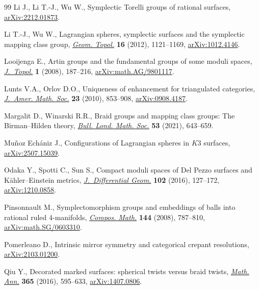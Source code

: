 \documentclass[pdftex]{sigma}
\theoremstyle{definition}
\numberwithin{equation}{section}
\begin{document}
\begin{thebibliography}{99}
Li J., Li T.-J., Wu W., Symplectic {T}orelli groups of rational surfaces,
 \href{http://arxiv.org/abs/2212.01873}{arXiv:2212.01873}.

Li T.-J., Wu W., Lagrangian spheres, symplectic surfaces and the symplectic
 mapping class group,
 \href{https://doi.org/10.2140/gt.2012.16.1121}{\textit{Geom. Topol.}}
 \textbf{16} (2012), 1121--1169,
 \href{http://arxiv.org/abs/1012.4146}{arXiv:1012.4146}.

Looijenga E., Artin groups and the fundamental groups of some moduli spaces,
 \href{https://doi.org/10.1112/jtopol/jtm009}{\textit{J.~Topol.}} \textbf{1}
 (2008), 187--216,
 \href{http://arxiv.org/abs/math.AG/9801117}{arXiv:math.AG/9801117}.

Lunts V.A., Orlov D.O., Uniqueness of enhancement for triangulated categories,
 \href{https://doi.org/10.1090/S0894-0347-10-00664-8}{\textit{J.~Amer. Math.
 Soc.}} \textbf{23} (2010), 853--908,
 \href{http://arxiv.org/abs/0908.4187}{arXiv:0908.4187}.

Margalit D., Winarski R.R., Braid groups and mapping class groups: {T}he
 {B}irman--{H}ilden theory,
 \href{https://doi.org/10.1112/blms.12456}{\textit{Bull. Lond. Math. Soc.}}
 \textbf{53} (2021), 643--659.

Mu\~noz Ech\'aniz J., Configurations of {L}agrangian spheres in {$K3$}
 surfaces, \href{http://arxiv.org/abs/2507.15039}{arXiv:2507.15039}.

Odaka Y., Spotti C., Sun S., Compact moduli spaces of {D}el {P}ezzo surfaces
 and {K}\"{a}hler--{E}instein metrics,
 \href{https://doi.org/10.4310/jdg/1452002879}{\textit{J.~Differential Geom.}}
 \textbf{102} (2016), 127--172,
 \href{http://arxiv.org/abs/1210.0858}{arXiv:1210.0858}.

Pinsonnault M., Symplectomorphism groups and embeddings of balls into rational
 ruled 4-manifolds,
 \href{https://doi.org/10.1112/S0010437X0700334X}{\textit{Compos. Math.}}
 \textbf{144} (2008), 787--810,
 \href{http://arxiv.org/abs/math.SG/0603310}{arXiv:math.SG/0603310}.

Pomerleano D., Intrinsic mirror symmetry and categorical crepant resolutions,
 \href{http://arxiv.org/abs/2103.01200}{arXiv:2103.01200}.

Qiu Y., Decorated marked surfaces: spherical twists versus braid twists,
 \href{https://doi.org/10.1007/s00208-015-1339-0}{\textit{Math. Ann.}}
 \textbf{365} (2016), 595--633,
 \href{http://arxiv.org/abs/1407.0806}{arXiv:1407.0806}.


\end{thebibliography}
\end{document}

